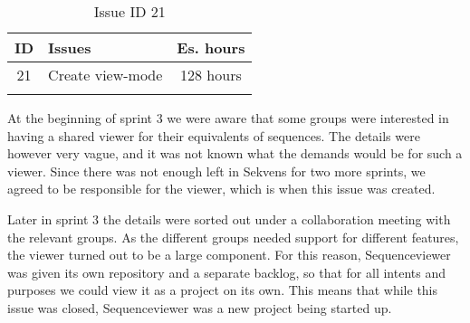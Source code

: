 \begin{longtable} { | c | p{12cm} | c | } 
\hline
	ID 	&	Issues	&		 Es. hours \\\hline
	21 	&	Create view-mode	&	128 hours \\\hline
\caption{Issue ID 21}
\label{tab:spr3_viewmodecreated}
\end{longtable}

At the beginning of sprint 3 we were aware that some groups were interested in having a shared viewer for their equivalents of sequences. The details were however very vague, and it was not known what the demands would be for such a viewer. Since there was not enough left in Sekvens for two more sprints, we agreed to be responsible for the viewer, which is when this issue was created.

Later in sprint 3 the details were sorted out under a collaboration meeting with the relevant groups. As the different groups needed support for different features, the viewer turned out to be a large component. For this reason, Sequenceviewer was given its own repository and a separate backlog, so that for all intents and purposes we could view it as a project on its own. This means that while this issue was closed, Sequenceviewer was a new project being started up. 